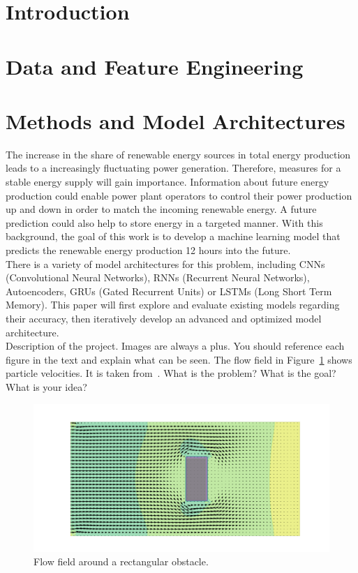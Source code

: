 \documentclass[11pt,table]{article}
\begin{document}
\newpage

\tableofcontents

\newpage


\section{Introduction}
\section{Data and Feature Engineering}
\section{Methods and Model Architectures}
The increase in the share of renewable energy sources in total energy production leads to a increasingly fluctuating power generation. Therefore, measures for a stable energy supply will gain importance. Information about future energy production could enable power plant operators to control their power production up and down in order to match the incoming renewable energy. A future prediction could also help to store energy in a targeted manner. 
With this background, the goal of this work is to develop a machine learning model that predicts the renewable energy production 12 hours into the future.\\
There is a variety of model architectures for this problem, including CNNs (Convolutional Neural Networks), RNNs (Recurrent Neural Networks), Autoencoders, GRUs (Gated Recurrent Units) or LSTMs (Long Short Term Memory). This paper will first explore and evaluate existing models regarding their accuracy, then iteratively develop an advanced and optimized model architecture.\\

Description of the project. Images are always a plus. You should reference each figure in the text and explain what can be seen. The flow field in Figure~\ref{fig:flow} shows particle velocities. It is taken from~\cite{Author2020}. What is the problem? What is the goal? What is your idea?\\ 

\begin{figure}[h]
	\centering
	\includegraphics[scale=0.9]{Figures/example_cover.png}
	\caption{Flow field around a rectangular obstacle.}
	\label{fig:flow}
\end{figure}
\end{document}
